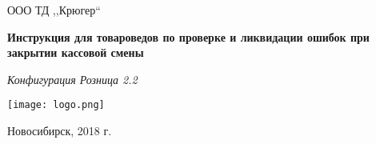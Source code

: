 \begin{titlepage}
\begin{center}
\large
ООО ТД ,,Крюгер``


\vspace{2.25cm}

\textbf{Инструкция для товароведов по проверке и ликвидации ошибок при закрытии кассовой смены } 

\textit{Конфигурация Розница 2.2}
\vfill    

{\texttt{[image: logo.png]}}  

\end{center}
\vfill

\newlength{\ML}


\begin{center}
Новосибирск, 2018 г.
\end{center}
\end{titlepage}
